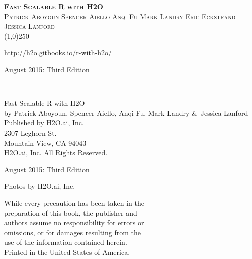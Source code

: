 







\thispagestyle{empty} %

\begin{center}
\textsc{\Large\bf{Fast Scalable R with H2O}}
\\
\bigskip
\textsc{\small{Patrick Aboyoun \hspace{40pt} Spencer Aiello \hspace{40pt} Anqi Fu \hspace{40pt} Mark Landry \hspace{40pt} Eric Eckstrand \hspace{40pt}  Jessica Lanford}}
\\
\bigskip
\line(1,0){250}  %

{\url{http://h2o.gitbooks.io/r-with-h2o/}}

\bigskip
August 2015: Third Edition 
\\%
\bigskip
\end{center}

\null\vfill
\begin{figure}[!b]
\noindent{}
\end{figure}

\newpage
\restoregeometry

\null\vfill %
\thispagestyle{empty} %


{\raggedright\vfill\ 

Fast Scalable R with H2O\\
  by Patrick Aboyoun,  Spencer Aiello, Anqi Fu, Mark Landry \&\ Jessica Lanford\\
\bigskip
  Published by H2O.ai, Inc. \\
2307 Leghorn St. \\
Mountain View, CA 94043\\
\bigskip
{} H2O.ai, Inc. All Rights Reserved. 
\bigskip

August 2015: Third Edition
\bigskip

Photos by \textcopyright H2O.ai, Inc. 
\bigskip

While every precaution has been taken in the\\
preparation of this book, the publisher and\\
authors assume no responsibility for errors or\\
omissions, or for damages resulting from the\\
use of the information contained herein.\\
\bigskip
Printed in the United States of America. 


}\par

